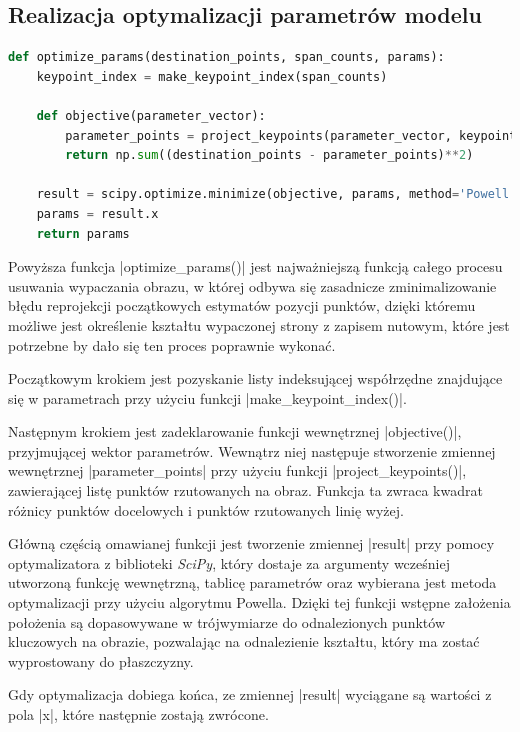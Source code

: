 \subsection{Realizacja optymalizacji parametrów modelu}

\begin{lstlisting}[caption={\pyth|optimize_params()| - funkcja optymalizucjąca parametry modelu.}, label={optimize-params}, language=Python]
def optimize_params(destination_points, span_counts, params):
	keypoint_index = make_keypoint_index(span_counts)
	
	def objective(parameter_vector):
		parameter_points = project_keypoints(parameter_vector, keypoint_index)
		return np.sum((destination_points - parameter_points)**2)
	
	result = scipy.optimize.minimize(objective, params, method='Powell')
	params = result.x
	return params
\end{lstlisting}

Powyższa funkcja \pyth|optimize_params()| jest najważniejszą funkcją całego procesu usuwania wypaczania obrazu, w której odbywa się zasadnicze zminimalizowanie błędu reprojekcji początkowych estymatów pozycji punktów, dzięki któremu możliwe jest określenie kształtu wypaczonej strony z zapisem nutowym, które jest potrzebne by dało się ten proces poprawnie wykonać.

Początkowym krokiem jest pozyskanie listy indeksującej współrzędne znajdujące się w parametrach przy użyciu funkcji \pyth|make_keypoint_index()|. 

Następnym krokiem jest zadeklarowanie funkcji wewnętrznej \pyth|objective()|, przyjmującej wektor parametrów. Wewnątrz niej następuje stworzenie zmiennej wewnętrznej \pyth|parameter_points| przy użyciu funkcji \pyth|project_keypoints()|, zawierającej listę punktów rzutowanych na obraz. Funkcja ta zwraca kwadrat różnicy punktów docelowych i punktów rzutowanych linię wyżej.

Główną częścią omawianej funkcji jest tworzenie zmiennej \pyth|result| przy pomocy optymalizatora z biblioteki \textit{SciPy}, który dostaje za argumenty wcześniej utworzoną funkcję wewnętrzną, tablicę parametrów oraz wybierana jest metoda optymalizacji przy użyciu algorytmu Powella. Dzięki tej funkcji wstępne założenia położenia są dopasowywane w trójwymiarze do odnalezionych punktów kluczowych na obrazie, pozwalając na odnalezienie kształtu, który ma zostać wyprostowany do płaszczyzny. 

Gdy optymalizacja dobiega końca, ze zmiennej \pyth|result| wyciągane są wartości z pola \pyth|x|, które następnie zostają zwrócone.



